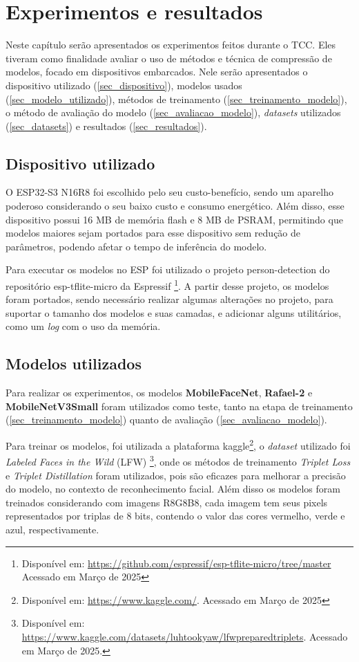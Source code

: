 \chapter{Experimentos e resultados}

Neste capítulo serão apresentados os experimentos feitos durante o TCC. Eles tiveram como
finalidade avaliar o uso de métodos e técnica de compressão de modelos, focado em dispositivos
embarcados. Nele serão apresentados o dispositivo utilizado (\autoref{sec_dispositivo}),
modelos usados (\autoref{sec_modelo_utilizado}), métodos de treinamento (\autoref{sec_treinamento_modelo}),
o método de avaliação do modelo (\autoref{sec_avaliacao_modelo}), \textit{datasets} utilizados
(\autoref{sec_datasets}) e resultados (\autoref{sec_resultados}).

\section{Dispositivo utilizado}\label{sec_dispositivo}
O ESP32-S3 N16R8 foi escolhido pelo seu custo-benefício, sendo um aparelho poderoso considerando o seu baixo
custo e consumo energético. Além disso, esse dispositivo possui 16 MB de memória flash e 8 MB de PSRAM,
permitindo que modelos maiores sejam portados para esse dispositivo sem redução de parâmetros, podendo afetar o
tempo de inferência do modelo.

Para executar os modelos no ESP foi utilizado o projeto person-detection do repositório esp-tflite-micro da Espressif
\footnote{Disponível em: \url{https://github.com/espressif/esp-tflite-micro/tree/master} Acessado em Março de 2025}.
A partir desse projeto, os modelos foram portados, sendo necessário realizar algumas alterações no projeto,
para suportar o tamanho dos modelos e suas camadas, e adicionar alguns utilitários, como um \textit{log} com
o uso da memória.

\section{Modelos utilizados}\label{sec_modelo_utilizado}
Para realizar os experimentos, os modelos \textbf{MobileFaceNet}, \textbf{Rafael-2} e \textbf{MobileNetV3Small}
foram utilizados como teste, tanto na etapa de treinamento (\autoref{sec_treinamento_modelo}) quanto de avaliação
(\autoref{sec_avaliacao_modelo}).

Para treinar os modelos, foi utilizada a plataforma kaggle\footnote{
Disponível em: \url{https://www.kaggle.com/}. Acessado em Março de 2025}, o \textit{dataset} utilizado foi
\textit{Labeled Faces in the Wild} (LFW) \footnote{
Disponível em: \url{https://www.kaggle.com/datasets/luhtookyaw/lfwpreparedtriplets}. Acessado em Março de 2025.},
onde os métodos de treinamento \textit{Triplet Loss} e \textit{Triplet Distillation}
\cite{triplet_distillation_face_recognition} foram utilizados, pois são eficazes para melhorar a precisão do modelo,
no contexto de reconhecimento facial.
Além disso os modelos foram treinados considerando com imagens R8G8B8, cada imagem tem seus pixels representados por
triplas de 8 bits, contendo o valor das cores vermelho, verde e azul, respectivamente.

